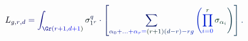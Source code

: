 \documentclass[12pt]{article}
\begin{document}
\makeatletter
\renewcommand*{\@textcolor}[3]{%
  \protect\leavevmode
  \begingroup
    \color#1{#2}#3%
  \endgroup
}
\makeatother
\begin{displaymath}
\mathcolor[RGB]{0,0,15}{L} _ { \mathcolor[RGB]{0,0,30}{g} \mathcolor[RGB]{0,0,45}{,} \mathcolor[RGB]{0,0,60}{r} \mathcolor[RGB]{0,0,75}{,} \mathcolor[RGB]{0,0,90}{d} } \mathcolor[RGB]{0,0,105}{=} \mathcolor[RGB]{0,0,120}{\int} _ { \mathcolor[RGB]{0,0,135}{\Gr} \mathcolor[RGB]{0,0,150}{(} \mathcolor[RGB]{0,0,165}{r} \mathcolor[RGB]{0,0,180}{+} \mathcolor[RGB]{0,0,195}{1} \mathcolor[RGB]{0,0,210}{,} \mathcolor[RGB]{0,0,225}{d} \mathcolor[RGB]{0,0,240}{+} \mathcolor[RGB]{0,0,255}{1} \mathcolor[RGB]{0,15,0}{)} } \mathcolor[RGB]{0,15,15}{\sigma} _ { \mathcolor[RGB]{0,15,30}{1} ^ { \mathcolor[RGB]{0,15,45}{r} } } ^ { \mathcolor[RGB]{0,15,60}{q} } \mathcolor[RGB]{0,15,75}{\cdot} \mathcolor[RGB]{0,15,90}{\left[} \mathcolor[RGB]{0,15,105}{\sum} _ { \mathcolor[RGB]{0,15,120}{\alpha} _ { \mathcolor[RGB]{0,15,135}{0} } \mathcolor[RGB]{0,15,150}{+} \mathcolor[RGB]{0,15,165}{.} \mathcolor[RGB]{0,15,180}{.} \mathcolor[RGB]{0,15,195}{.} \mathcolor[RGB]{0,15,210}{+} \mathcolor[RGB]{0,15,225}{\alpha} _ { \mathcolor[RGB]{0,15,240}{r} } \mathcolor[RGB]{0,15,255}{=} \mathcolor[RGB]{0,30,0}{(} \mathcolor[RGB]{0,30,15}{r} \mathcolor[RGB]{0,30,30}{+} \mathcolor[RGB]{0,30,45}{1} \mathcolor[RGB]{0,30,60}{)} \mathcolor[RGB]{0,30,75}{(} \mathcolor[RGB]{0,30,90}{d} \mathcolor[RGB]{0,30,105}{-} \mathcolor[RGB]{0,30,120}{r} \mathcolor[RGB]{0,30,135}{)} \mathcolor[RGB]{0,30,150}{-} \mathcolor[RGB]{0,30,165}{r} \mathcolor[RGB]{0,30,180}{g} } \mathcolor[RGB]{0,30,195}{\left(} \mathcolor[RGB]{0,30,210}{\prod} _ { \mathcolor[RGB]{0,30,225}{i} \mathcolor[RGB]{0,30,240}{=} \mathcolor[RGB]{0,30,255}{0} } ^ { \mathcolor[RGB]{0,45,0}{r} } \mathcolor[RGB]{0,45,15}{\sigma} _ { \mathcolor[RGB]{0,45,30}{\alpha} _ { \mathcolor[RGB]{0,45,45}{i} } } \mathcolor[RGB]{0,45,60}{\right)} \mathcolor[RGB]{0,45,75}{\right]} \mathcolor[RGB]{0,45,90}{.}
\end{displaymath}
\end{document}
